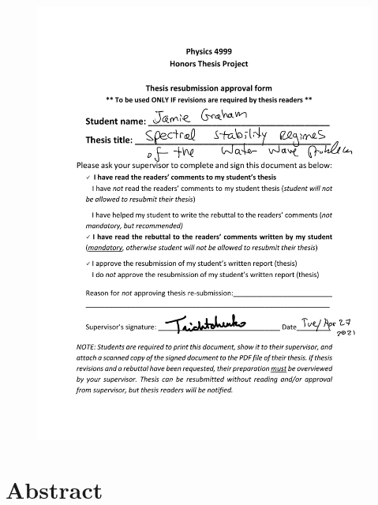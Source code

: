 \documentclass{article}
\begin{document}
\setlength{\parindent}{0pt}

\begin{figure}
    \centering
    \includegraphics[scale = .9]{ResubmissionForm.pdf}
    \label{fig:my_label}
\end{figure}

\clearpage

\section{Abstract}
\end{document}
